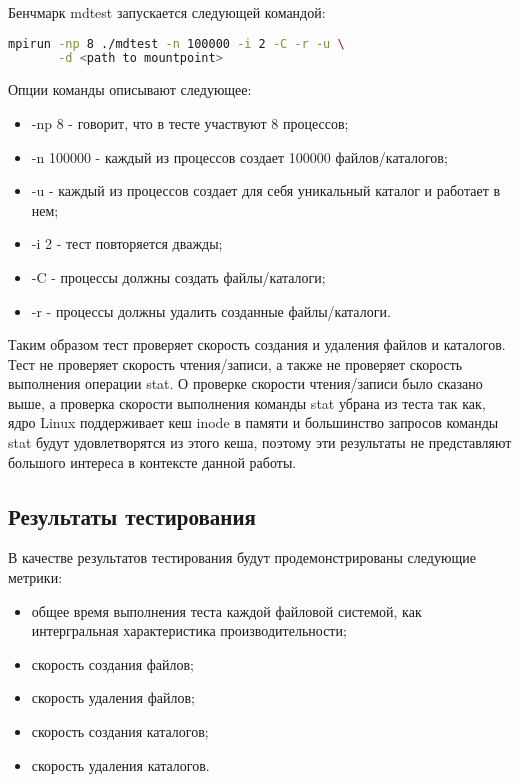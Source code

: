 Бенчмарк mdtest запускается следующей командой:
\begin{lstlisting}[basicstyle=\ttfamily,language=bash]
mpirun -np 8 ./mdtest -n 100000 -i 2 -C -r -u \
       -d <path to mountpoint>
\end{lstlisting}

Опции команды описывают следующее:
\begin{itemize}
  \item -np 8 - говорит, что в тесте участвуют 8 процессов;
  \item -n 100000 - каждый из процессов создает 100000 файлов/каталогов;
  \item -u - каждый из процессов создает для себя уникальный каталог и работает
        в нем;
  \item -i 2 - тест повторяется дважды;
  \item -C - процессы должны создать файлы/каталоги;
  \item -r - процессы должны удалить созданные файлы/каталоги.
\end{itemize}

Таким образом тест проверяет скорость создания и удаления файлов и каталогов.
Тест не проверяет скорость чтения/записи, а также не проверяет скорость
выполнения операции stat. О проверке скорости чтения/записи было сказано выше,
а проверка скорости выполнения команды stat убрана из теста так как, ядро Linux
поддерживает кеш inode в памяти и большинство запросов команды stat будут
удовлетворятся из этого кеша, поэтому эти результаты не представляют большого
интереса в контексте данной работы.


\subsection{Результаты тестирования}

В качестве результатов тестирования будут продемонстрированы следующие метрики:
\begin{itemize}
  \item общее время выполнения теста каждой файловой системой, как интергральная
        характеристика производительности;
  \item скорость создания файлов;
  \item скорость удаления файлов;
  \item скорость создания каталогов;
  \item скорость удаления каталогов.
\end{itemize}


